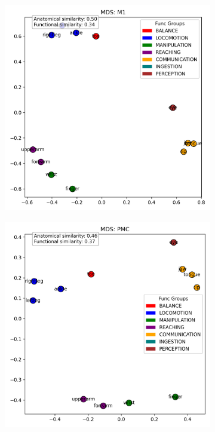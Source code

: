 \documentclass{article}
\begin{document}
\begin{figure}[!htbp]
    \centering
    \begin{subfigure}[b]{0.45\textwidth}
        \centering
        \includegraphics[width=\textwidth]{results/goal_dual/mds_M1_with_metrics.png}
        \label{fig:mds_coord_dual}
    \end{subfigure}
    \hfill
    \begin{subfigure}[b]{0.45\textwidth}
        \centering
        \includegraphics[width=\textwidth]{results/goal_dual/mds_PMC_with_metrics.png}

\end{subfigure}
\end{figure}
\end{document}
